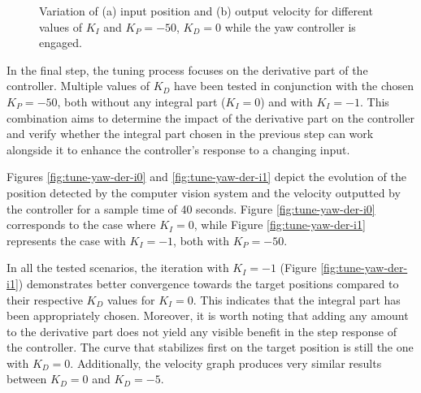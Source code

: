 \begin{figure}
  \centering
  \caption{Variation of (a) input position and (b) output velocity for different values of $K_{I}$ and $K_P=-50$, $K_D=0$ while the yaw controller is engaged.}\label{fig:tune-yaw-int-50}
\end{figure}


In the final step, the tuning process focuses on the derivative part of the controller. Multiple values of $K_D$ have been tested in conjunction with the chosen $K_P=-50$, both without any integral part ($K_I=0$) and with $K_I=-1$.
This combination aims to determine the impact of the derivative part on the controller and verify whether the integral part chosen in the previous step can work alongside it to enhance the controller's response to a changing input.

Figures \ref{fig:tune-yaw-der-i0} and \ref{fig:tune-yaw-der-i1} depict the evolution of the position detected by the computer vision system and the velocity outputted by the controller for a sample time of 40 seconds. Figure \ref{fig:tune-yaw-der-i0} corresponds to the case where $K_I=0$, while Figure \ref{fig:tune-yaw-der-i1} represents the case with $K_I=-1$, both with $K_P=-50$.

In all the tested scenarios, the iteration with $K_I=-1$ (Figure \ref{fig:tune-yaw-der-i1}) demonstrates better convergence towards the target positions compared to their respective $K_D$ values for $K_I=0$. This indicates that the integral part has been appropriately chosen. Moreover, it is worth noting that adding any amount to the derivative part does not yield any visible benefit in the step response of the controller. The curve that stabilizes first on the target position is still the one with $K_D=0$. Additionally, the velocity graph produces very similar results between $K_D=0$ and $K_D=-5$.

